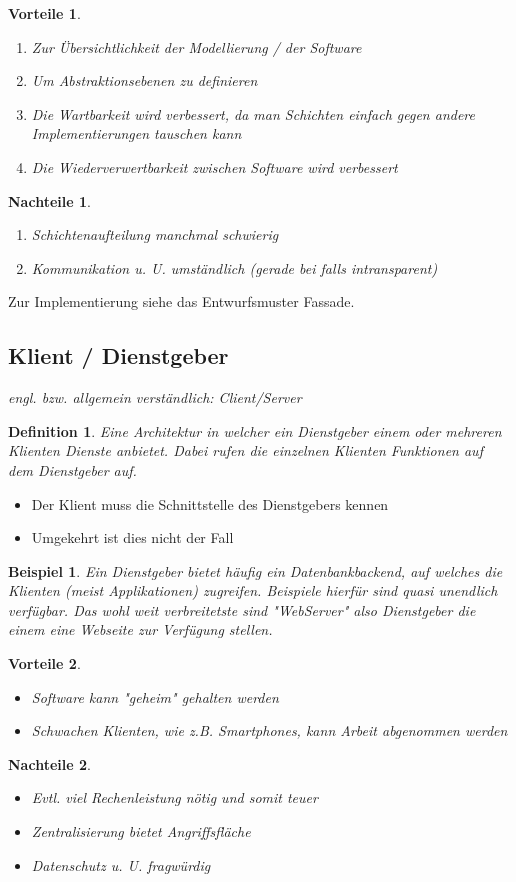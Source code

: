 \documentclass[a4paper]{article}
\theoremstyle{break}
\newtheorem{defi}{Definition}[section]
\newtheorem{ex}{Beispiel}[section]
\newtheorem{why}{Vorteile}[section]
\newtheorem{whynot}{Nachteile}[section]
\begin{document}
\begin{why}
	\begin{enumerate}
		\item Zur Übersichtlichkeit der Modellierung / der Software
		\item Um Abstraktionsebenen zu definieren
		\item Die Wartbarkeit wird verbessert, da man Schichten einfach gegen andere Implementierungen tauschen kann
		\item Die Wiederverwertbarkeit zwischen Software wird verbessert
		
	\end{enumerate}
\end{why}
\begin{whynot}
	\begin{enumerate}
		\item Schichtenaufteilung manchmal schwierig
		\item Kommunikation u. U. umständlich (gerade bei falls intransparent)
	\end{enumerate}
\end{whynot}
Zur Implementierung siehe das Entwurfsmuster Fassade.


\subsection{Klient / Dienstgeber}
\textit{engl. bzw. allgemein verständlich: Client/Server}
\begin{defi}
	Eine Architektur in welcher ein Dienstgeber einem oder mehreren Klienten Dienste anbietet. Dabei rufen die einzelnen Klienten Funktionen auf dem Dienstgeber auf.
\end{defi}
\begin{itemize}
	\item Der Klient muss die Schnittstelle des Dienstgebers kennen
	\item Umgekehrt ist dies nicht der Fall
\end{itemize}
\begin{ex}
	Ein Dienstgeber bietet häufig ein Datenbankbackend, auf welches die Klienten (meist Applikationen) zugreifen. Beispiele hierfür sind quasi unendlich verfügbar. Das wohl weit verbreitetste sind "WebServer" also Dienstgeber die einem eine Webseite zur Verfügung stellen.
\end{ex}
\begin{why}
	\begin{itemize}
		\item Software kann "geheim" gehalten werden
		\item Schwachen Klienten, wie z.B. Smartphones, kann Arbeit abgenommen werden
	\end{itemize}
\end{why}
\begin{whynot}
	\begin{itemize}
		\item Evtl. viel Rechenleistung nötig und somit teuer
		\item Zentralisierung bietet Angriffsfläche
		\item Datenschutz u. U. fragwürdig
	\end{itemize}
\end{whynot}
\end{document}
